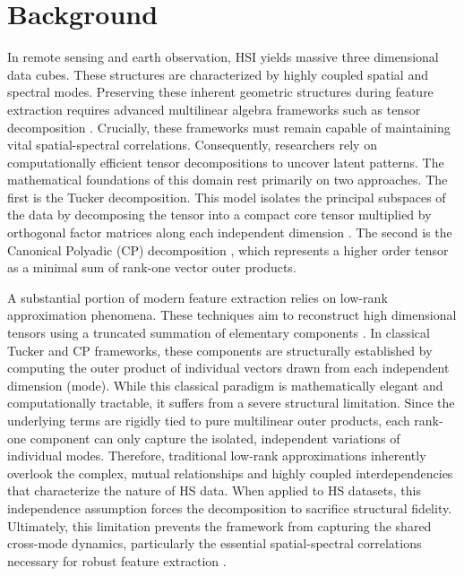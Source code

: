 \documentclass[12pt,onecolumn]{article}
\begin{document}
\section{Background}
\label{sec:bg}

In remote sensing and earth observation, HSI yields massive three dimensional data cubes. These structures are characterized by highly coupled spatial and spectral modes. Preserving these inherent geometric structures during feature extraction requires advanced multilinear algebra frameworks such as tensor decomposition \cite{kolda,sidiropoulos}. Crucially, these frameworks must remain capable of maintaining vital spatial-spectral correlations. Consequently, researchers rely on computationally efficient tensor decompositions to uncover latent patterns. The mathematical foundations of this domain rest primarily on two approaches. The first is the Tucker decomposition. This model isolates the principal subspaces of the data by decomposing the tensor into a compact core tensor multiplied by orthogonal factor matrices along each independent dimension \cite{tucker_hsi}. The second is the Canonical Polyadic (CP) decomposition \cite{cp_hsi}, which represents a higher order tensor as a minimal sum of rank-one vector outer products. 

A substantial portion of modern feature extraction relies on low-rank approximation phenomena. These techniques aim to reconstruct high dimensional tensors using a truncated summation of elementary components \cite{kolda,sidiropoulos}. In classical Tucker and CP frameworks, these components are structurally established by computing the outer product of individual vectors drawn from each independent dimension (mode). While this classical paradigm is mathematically elegant and computationally tractable, it suffers from a severe structural limitation. Since the underlying terms are rigidly tied to pure multilinear outer products, each rank-one component can only capture the isolated, independent variations of individual modes. Therefore, traditional low-rank approximations inherently overlook the complex, mutual relationships and highly coupled interdependencies that characterize the nature of HS data. When applied to HS datasets, this independence assumption forces the decomposition to sacrifice structural fidelity. Ultimately, this limitation prevents the framework from capturing the shared cross-mode dynamics, particularly the essential spatial-spectral correlations necessary for robust feature extraction \cite{tensor_review}.
\end{document}
